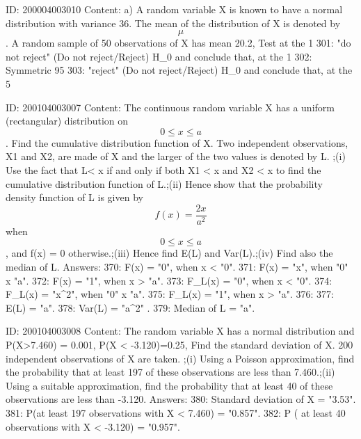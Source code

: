 \documentclass{article}
\begin{document}
ID: 200004003010
Content:
a) A random variable X is known to have a normal distribution with variance 36. The mean of the distribution of X is denoted by $$\mu$$. A random sample of 50 observations of X has mean 20.2, Test at the 1%
301: "do not reject" (Do not reject/Reject) H_0 and conclude that, at the 1%
302: Symmetric 95%
303: "reject" (Do not reject/Reject) H_0 and conclude that, at the 5%

ID: 200104003007
Content:
The continuous random variable X has a uniform (rectangular) distribution on $$0 \leq x \leq a$$. Find the cumulative distribution function of X. Two independent observations, X1 and X2, are made of X and the larger of the two values is denoted by L. ;(i) Use the fact that L< x if and only if both X1 < x and X2 < x to find the cumulative distribution function of L.;(ii) Hence show that the probability density function of L is given by $$f(x)=\frac{2x}{a^2}$$ when $$0 \leq x \leq a$$, and f(x) = 0 otherwise.;(iii) Hence find E(L) and Var(L).;(iv) Find also the median of L. Answers:
370: F(x) = "0", when x < "0".
371: F(x) = "x", when "0" \leq x \leq "a".
372: F(x) = "1", when x > "a".
373: F_L(x) = "0", when x < "0".
374: F_L(x) = "x^2", when "0" \leq x \leq "a".
375: F_L(x) = "1", when x > "a".
376: 
377: E(L) = "a".
378: Var(L) = "a^2" .
379: Median of L = "a".

ID: 200104003008
Content:
The random variable X has a normal distribution and P(X>7.460) = 0.001, P(X < -3.120)=0.25, Find the standard deviation of X. 200 independent observations of X are taken. ;(i) Using a Poisson approximation, find the probability that at least 197 of these observations are less than 7.460.;(ii) Using a suitable approximation, find the probability that at least 40 of these observations are less than -3.120.  Answers:
380: Standard deviation of X = "3.53".
381: P(at least 197 observations with X < 7.460) = "0.857".
382: P ( at least 40 observations with X < -3.120) = "0.957".
\end{document}

